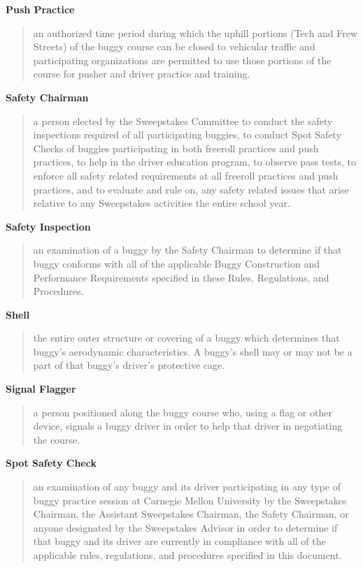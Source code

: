 \documentclass[openany]{book}
\begin{document}
\textbf{Push Practice}
\begin{quote}
	an authorized time period during which the uphill portions (Tech and Frew Streets) of the buggy course can be closed to vehicular traffic and participating organizations are permitted to use those portions of the course for pusher and driver practice and training.
\end{quote}

\textbf{Safety Chairman}
\begin{quote}
	a person elected by the Sweepstakes Committee to conduct the safety inspections required of all participating buggies, to conduct Spot Safety Checks of buggies participating in both freeroll practices and push practices, to help in the driver education program, to observe pass tests, to enforce all safety related requirements at all freeroll practices and push practices, and to evaluate and rule on, any safety related issues that arise relative to any Sweepstakes activities the entire school year.
\end{quote}

\textbf{Safety Inspection}
\begin{quote}
	an examination of a buggy by the Safety Chairman to determine if that buggy conforms with all of the applicable Buggy Construction and Performance Requirements specified in these Rules, Regulations, and Procedures.
\end{quote}

\textbf{Shell}
\begin{quote}
	the entire outer structure or covering of a buggy which determines that buggy's aerodynamic characteristics. A buggy's shell may or may not be a part of that buggy's driver's protective cage.
\end{quote}

\textbf{Signal Flagger}
\begin{quote}
	a person positioned along the buggy course who, using a flag or other device, signals a buggy driver in order to help that driver in negotiating the course.
\end{quote}

\textbf{Spot Safety Check}
\begin{quote}
	an examination of any buggy and its driver participating in any type of buggy practice session at Carnegie Mellon University by the Sweepstakes Chairman, the Assistant Sweepstakes Chairman, the Safety Chairman, or anyone designated by the Sweepstakes Advisor in order to determine if that buggy and its driver are currently in compliance with all of the applicable rules, regulations, and procedures specified in this document.
\end{quote}
\end{document}
